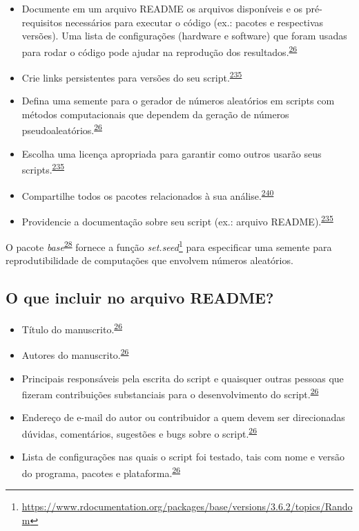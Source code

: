 \documentclass[
  a4paper,
]{book}
\renewcommand{\href}[2]{#2\footnote{\url{#1}}}
\newenvironment{infobox}[1]
  {
  \begin{itemize}
  \renewcommand{\labelitemi}{
    \raisebox{-.7\height}[0pt][0pt]{
      {\setkeys{Gin}{width=3em,keepaspectratio}
        \texttt{[image: \#1]}}
    }
  }
  \setlength{\fboxsep}{1em}
  \begin{blackbox}
  \item
  }
  {
  \end{blackbox}
  \end{itemize}
  }
\begin{document}
\begin{itemize}
\item
  Documente em um arquivo README os arquivos disponíveis e os pré-requisitos necessários para executar o código (ex.: pacotes e respectivas versões). Uma lista de configurações (hardware e software) que foram usadas para rodar o código pode ajudar na reprodução dos resultados.\textsuperscript{\protect\hyperlink{ref-hofner2015}{26}}
\item
  Crie links persistentes para versões do seu script.\textsuperscript{\protect\hyperlink{ref-Eglen2017}{235}}
\item
  Defina uma semente para o gerador de números aleatórios em scripts com métodos computacionais que dependem da geração de números pseudoaleatórios.\textsuperscript{\protect\hyperlink{ref-hofner2015}{26}}
\item
  Escolha uma licença apropriada para garantir como outros usarão seus scripts.\textsuperscript{\protect\hyperlink{ref-Eglen2017}{235}}
\item
  Compartilhe todos os pacotes relacionados à sua análise.\textsuperscript{\protect\hyperlink{ref-Zhao2023}{240}}
\item
  Providencie a documentação sobre seu script (ex.: arquivo README).\textsuperscript{\protect\hyperlink{ref-Eglen2017}{235}}
\end{itemize}

\begin{infobox}{images/Rlogo}
O pacote \emph{base}\textsuperscript{\protect\hyperlink{ref-base-5}{28}} fornece a função \href{https://www.rdocumentation.org/packages/base/versions/3.6.2/topics/Random}{\emph{set.seed}} para especificar uma semente para reprodutibilidade de computações que envolvem números aleatórios.

\end{infobox}

\hypertarget{o-que-incluir-no-arquivo-readme}{%
\subsection{O que incluir no arquivo README?}\label{o-que-incluir-no-arquivo-readme}}

\begin{itemize}
\item
  Título do manuscrito.\textsuperscript{\protect\hyperlink{ref-hofner2015}{26}}
\item
  Autores do manuscrito.\textsuperscript{\protect\hyperlink{ref-hofner2015}{26}}
\item
  Principais responsáveis pela escrita do script e quaisquer outras pessoas que fizeram contribuições substanciais para o desenvolvimento do script.\textsuperscript{\protect\hyperlink{ref-hofner2015}{26}}
\item
  Endereço de e-mail do autor ou contribuidor a quem devem ser direcionadas dúvidas, comentários, sugestões e bugs sobre o script.\textsuperscript{\protect\hyperlink{ref-hofner2015}{26}}
\item
  Lista de configurações nas quais o script foi testado, tais com nome e versão do programa, pacotes e plataforma.\textsuperscript{\protect\hyperlink{ref-hofner2015}{26}}
\end{itemize}
\end{document}
